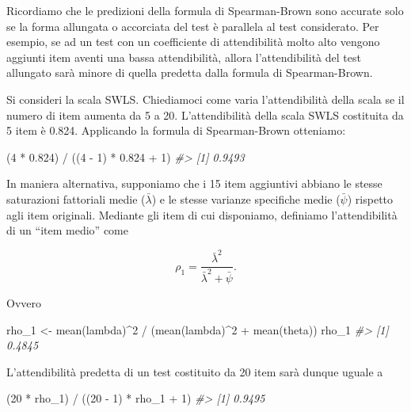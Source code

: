 \documentclass[
  11pt,
]{krantz}
\makeatletter
\newenvironment{Shaded}{\begin{snugshade}}{\end{snugshade}}
\newcommand{\CommentTok}[1]{\textcolor[rgb]{0.37,0.37,0.37}{\textit{#1}}}
\newcommand{\DecValTok}[1]{\textcolor[rgb]{0.06,0.06,0.06}{#1}}
\newcommand{\FloatTok}[1]{\textcolor[rgb]{0.06,0.06,0.06}{#1}}
\newcommand{\FunctionTok}[1]{\textcolor[rgb]{0,0,0}{#1}}
\newcommand{\NormalTok}[1]{#1}
\newcommand{\OtherTok}[1]{\textcolor[rgb]{0.37,0.37,0.37}{#1}}
\newcommand{\SpecialCharTok}[1]{\textcolor[rgb]{0,0,0}{#1}}
\newenvironment{kframe}{%
\medskip{}
\setlength{\fboxsep}{.8em}
 \def\at@end@of@kframe{}%
 \ifinner\ifhmode%
  \def\at@end@of@kframe{\end{minipage}}%
  \begin{minipage}{\columnwidth}%
 \fi\fi%
 \def\FrameCommand##1{\hskip\@totalleftmargin \hskip-\fboxsep
 \colorbox{shadecolor}{##1}\hskip-\fboxsep
     \hskip-\linewidth \hskip-\@totalleftmargin \hskip\columnwidth}%
 \MakeFramed {\advance\hsize-\width
   \@totalleftmargin\z@ \linewidth\hsize
   \@setminipage}}%
 {\par\unskip\endMakeFramed%
 \at@end@of@kframe}
\renewenvironment{Shaded}{\begin{kframe}}{\end{kframe}}
\theoremstyle{definition}
\theoremstyle{definition}
\theoremstyle{definition}
\theoremstyle{definition}
\theoremstyle{remark}
\makeatother
\begin{document}
Ricordiamo che le predizioni della formula di Spearman-Brown sono accurate solo se la forma allungata o accorciata del test è parallela al test considerato. Per esempio, se ad un test con un coefficiente di attendibilità molto alto vengono aggiunti item aventi una bassa attendibilità, allora l'attendibilità del test allungato sarà minore di quella predetta dalla formula di Spearman-Brown.

Si consideri la scala SWLS. Chiediamoci come varia l'attendibilità della scala se il numero di item aumenta da 5 a 20. L'attendibilità della scala SWLS costituita da 5 item è 0.824. Applicando la formula di Spearman-Brown otteniamo:

\begin{Shaded}
\begin{Highlighting}[]
\NormalTok{(}\DecValTok{4} \SpecialCharTok{*} \FloatTok{0.824}\NormalTok{) }\SpecialCharTok{/}\NormalTok{ ((}\DecValTok{4} \SpecialCharTok{{-}} \DecValTok{1}\NormalTok{) }\SpecialCharTok{*} \FloatTok{0.824} \SpecialCharTok{+} \DecValTok{1}\NormalTok{)}
\CommentTok{\#\textgreater{} [1] 0.9493}
\end{Highlighting}
\end{Shaded}

In maniera alternativa, supponiamo che i 15 item aggiuntivi abbiano le stesse saturazioni fattoriali medie (\(\bar{\lambda}\)) e le stesse varianze specifiche medie (\(\bar{\psi}\)) rispetto agli item originali. Mediante gli item di cui disponiamo, definiamo l'attendibilità di un ``item medio'' come

\[\rho_1 = \frac{\bar{\lambda}^2}{\bar{\lambda}^2 + \bar{\psi}}.\]

Ovvero

\begin{Shaded}
\begin{Highlighting}[]
\NormalTok{rho\_1 }\OtherTok{\textless{}{-}} \FunctionTok{mean}\NormalTok{(lambda)}\SpecialCharTok{\^{}}\DecValTok{2} \SpecialCharTok{/}\NormalTok{ (}\FunctionTok{mean}\NormalTok{(lambda)}\SpecialCharTok{\^{}}\DecValTok{2} \SpecialCharTok{+} \FunctionTok{mean}\NormalTok{(theta))}
\NormalTok{rho\_1}
\CommentTok{\#\textgreater{} [1] 0.4845}
\end{Highlighting}
\end{Shaded}

L'attendibilità predetta di un test costituito da 20 item sarà dunque uguale a

\begin{Shaded}
\begin{Highlighting}[]
\NormalTok{(}\DecValTok{20} \SpecialCharTok{*}\NormalTok{ rho\_1) }\SpecialCharTok{/}\NormalTok{ ((}\DecValTok{20} \SpecialCharTok{{-}} \DecValTok{1}\NormalTok{) }\SpecialCharTok{*}\NormalTok{ rho\_1 }\SpecialCharTok{+} \DecValTok{1}\NormalTok{)}
\CommentTok{\#\textgreater{} [1] 0.9495}
\end{Highlighting}
\end{Shaded}
\end{document}

